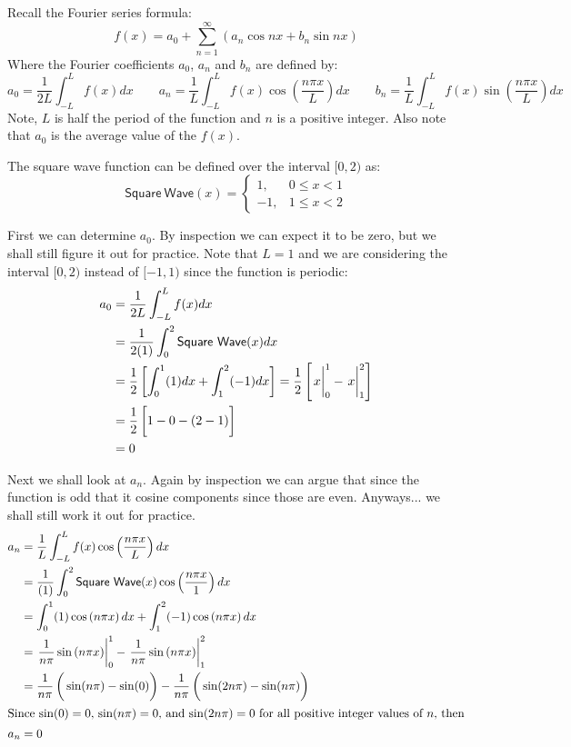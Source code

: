 \documentclass[letterpaper,8pt]{article}
\begin{document}

Recall the Fourier series formula:
\[
f(x) = a_0 + \sum_{n = 1}^\infty \left( a_n \cos nx + b_n \sin nx \right)
\]
Where the Fourier coefficients $a_0$, $a_n$ and $b_n$ are defined by:
\[
a_0 = \frac{1}{2L} \int_{-L}^L f(x) dx  \qquad
a_n = \frac{1}{L}  \int_{-L}^L f(x) \cos \left( \frac{n\pi x}{L} \right) dx \qquad
b_n = \frac{1}{L}  \int_{-L}^L f(x) \sin \left( \frac{n\pi x}{L} \right) dx 
\]
Note, $L$ is half the period of the function and $n$ is a positive integer.  Also note that $a_0$ is the average value of the $f(x)$.



The square wave function can be defined over the interval $[0, 2)$ as:
\[
\mathsf{Square\ Wave}(x) = \left\{ 
      \begin{array}{ll} 1, & 0 \leq x < 1 \\ 
                       -1, & 1 \leq x < 2 \end{array} \right.
\]

First we can determine $a_0$.  By inspection we can expect it to be zero, but we shall still 
figure it out for practice.  Note that $L = 1$ and we are considering the interval $[0, 2)$ instead
of $[-1, 1)$ since the function is periodic:
\begin{align*}
a_0 &= \frac{1}{2L} \int_{-L}^L f(x) dx  \\
    &= \frac{1}{2(1)} \int_{0}^{2} \mathsf{Square\ Wave}(x) dx \\
    &= \frac{1}{2} \left[ \int_0^1 (1) dx + \int_1^2 (-1) dx \right] = \frac{1}{2} \left[ \left. \vphantom{\frac{1}{2}} x\right|^1_0 - \left. \vphantom{\frac{1}{2}} x\right|^2_1 \right] \\
    &= \frac{1}{2} \left[ \vphantom{\frac{1}{2}} 1 - 0 - (2 - 1) \right] \\
    &= 0
\end{align*}

Next we shall look at $a_n$.  Again by inspection we can argue that since the function is odd that it
cosine components since those are even.  Anyways... we shall still work it out for practice.
\begin{align*}
a_n &= \frac{1}{L}  \int_{-L}^L f(x) \cos \left( \frac{n\pi x}{L} \right) dx \\
    &= \frac{1}{(1)} \int_{0}^{2} \mathsf{Square\ Wave}(x)\cos \left( \frac{n\pi x}{1} \right) dx \\ 
    &= \int_0^1 (1) \cos \left( n\pi x \right) dx + \int_1^2 (-1) \cos \left( n\pi x \right) dx \\
    &= \left. \frac{1}{n \pi} \sin \left( n\pi x \right)\right|^1_0 -  \left. \frac{1}{n \pi} \sin \left( n\pi x \right)\right|^2_1 \\
    &= \frac{1}{n \pi} \left( \vphantom{\frac{1}{2}} \sin ( n\pi) - \sin(0) \right) - \frac{1}{n \pi} \left( \vphantom{\frac{1}{2}} \sin (2n\pi) - \sin(n\pi) \right) \\
\intertext{Since $\sin(0) = 0$, $\sin ( n\pi) = 0$, and $\sin (2n\pi) = 0$ for all positive integer values of $n$, then}
a_n &= 0
\end{align*}
\end{document}

